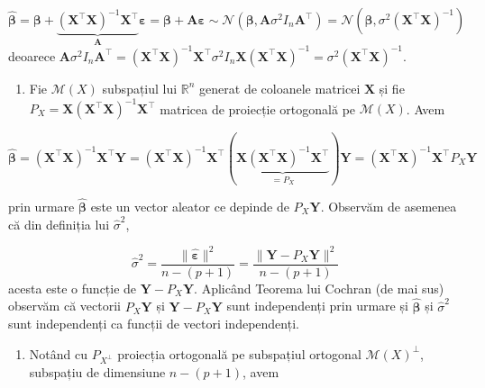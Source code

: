 \documentclass[]{article}
\providecommand{\tightlist}{%
  \setlength{\itemsep}{0pt}\setlength{\parskip}{0pt}}
\begin{document}
\[
\hat{\boldsymbol \beta} = \boldsymbol \beta + \underbrace{(\boldsymbol X^\intercal\boldsymbol X)^{-1}\boldsymbol X^\intercal}_{\boldsymbol A} \boldsymbol \varepsilon = \boldsymbol \beta + \boldsymbol A\boldsymbol \varepsilon \sim \mathcal{N}\left(\boldsymbol \beta, \boldsymbol A \sigma^2 I_n\boldsymbol A^\intercal\right) = \mathcal{N}\left(\boldsymbol \beta, \sigma^2(\boldsymbol X^\intercal\boldsymbol X)^{-1}\right) 
\] deoarece
\(\boldsymbol A \sigma^2 I_n\boldsymbol A^\intercal = (\boldsymbol X^\intercal\boldsymbol X)^{-1}\boldsymbol X^\intercal \sigma^2 I_n \boldsymbol X(\boldsymbol X^\intercal\boldsymbol X)^{-1} = \sigma^2(\boldsymbol X^\intercal\boldsymbol X)^{-1}\).

\begin{enumerate}
\def\labelenumi{\arabic{enumi}.}
\setcounter{enumi}{1}
\tightlist
\item
  Fie \(\mathcal{M}(X)\) subspațiul lui \(\mathbb{R}^n\) generat de
  coloanele matricei \(\boldsymbol X\) și fie
  \(P_{X} = \boldsymbol X(\boldsymbol X^\intercal\boldsymbol X)^{-1}\boldsymbol X^\intercal\)
  matricea de proiecție ortogonală pe \(\mathcal{M}(X)\). Avem
\end{enumerate}

\[
\hat{\boldsymbol \beta} = (\boldsymbol X^\intercal\boldsymbol X)^{-1}\boldsymbol X^\intercal\boldsymbol Y = (\boldsymbol X^\intercal\boldsymbol X)^{-1}\boldsymbol X^\intercal\left(\underbrace{\boldsymbol X(\boldsymbol X^\intercal\boldsymbol X)^{-1}\boldsymbol X^\intercal}_{=P_X}\right)\boldsymbol Y = (\boldsymbol X^\intercal\boldsymbol X)^{-1}\boldsymbol X^\intercal P_X\boldsymbol Y
\]

prin urmare \(\hat{\boldsymbol \beta}\) este un vector aleator ce
depinde de \(P_X\boldsymbol Y\). Observăm de asemenea că din definiția
lui \(\hat{\sigma}^2\),

\[
\hat{\sigma}^2 = \frac{\lVert\hat{\boldsymbol\varepsilon}\rVert^2}{n - (p+1)} = \frac{\lVert \boldsymbol Y - P_X\boldsymbol Y\rVert^2}{n - (p+1)}
\] acesta este o funcție de \(\boldsymbol Y - P_X\boldsymbol Y\).
Aplicând Teorema lui Cochran (de mai sus) observăm că vectorii
\(P_X\boldsymbol Y\) și \(\boldsymbol Y - P_X\boldsymbol Y\) sunt
independenți prin urmare și \(\hat{\boldsymbol \beta}\) și
\(\hat{\sigma}^2\) sunt independenți ca funcții de vectori independenți.

\begin{enumerate}
\def\labelenumi{\arabic{enumi}.}
\setcounter{enumi}{2}
\tightlist
\item
  Notând cu \(P_{X^\perp}\) proiecția ortogonală pe subspațiul ortogonal
  \(\mathcal{M}(X)^\perp\), subspațiu de dimensiune \(n-(p+1)\), avem
\end{enumerate}
\end{document}

